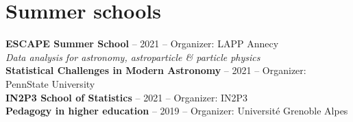 \section{Summer schools}\label{schools}

\textbf{ESCAPE Summer School} -- 2021 -- Organizer: LAPP Annecy \\
    \textit{Data analysis for astronomy, astroparticle \& particle physics} \\[5pt]
\textbf{Statistical Challenges in Modern Astronomy} -- 2021 -- Organizer: PennState University \\[5pt]
\textbf{IN2P3 School of Statistics} -- 2021 -- Organizer: IN2P3 \\[5pt]
\textbf{Pedagogy in higher education} -- 2019 -- Organizer: Universit\'e Grenoble Alpes
